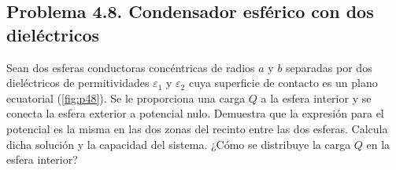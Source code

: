 

\subsection{Problema 4.8. Condensador esférico con dos dieléctricos}\label{sec:p48}

\begin{problema}\label{prob:dos-hemisferios}
Sean dos esferas conductoras concéntricas de radios $a$ y $b$ separadas por dos dieléctricos de permitividades $\varepsilon_1$ y $\varepsilon_2$ cuya superficie
de contacto es un plano ecuatorial (\cref{fig:p48}). Se le proporciona una carga $Q$ a la esfera interior y se conecta la esfera exterior a potencial
nulo. Demuestra que la expresión para el potencial es la misma en las dos zonas del recinto entre las dos esferas. Calcula dicha solución y la
capacidad del sistema. ¿Cómo se distribuye la carga $Q$ en la esfera interior?
\end{problema}

